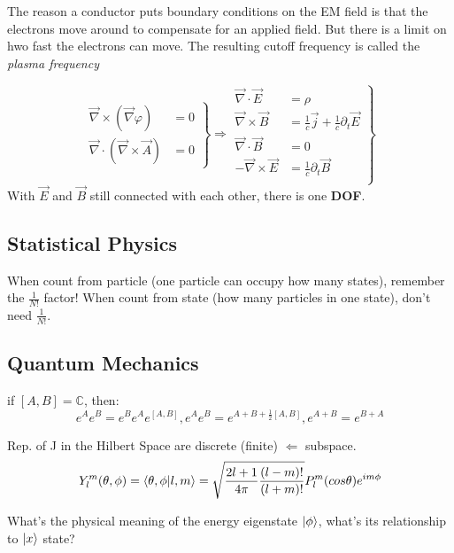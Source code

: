 The reason a conductor puts boundary conditions on the EM field is that the
electrons move around to compensate for an applied field. But there is a
limit on hwo fast the electrons can move. The resulting cutoff frequency is
called the \textit{plasma frequency}
\begin{description}[style=nextline]
    \item [Maxwell Eqn] 
	\begin{equation}
	    \left.
	    \begin{aligned}
		\overrightarrow{\nabla} \times (\overrightarrow{\nabla} \varphi) &= 0 \\
		\overrightarrow{\nabla} \cdot (\overrightarrow{\nabla} \times \overrightarrow{A}) &= 0
	    \end{aligned}
	    \right\} 
	    \Rightarrow 
	    \left.
	    \begin{aligned}
		\overrightarrow{\nabla} \cdot \overrightarrow{E} &= \rho \\
		\overrightarrow{\nabla} \times \overrightarrow{B} &=
		\frac{1}{c} \overrightarrow{j} + \frac{1}{c}\partial_{t}\overrightarrow{E}   \\
		\overrightarrow{\nabla} \cdot \overrightarrow{B} &= 0	\\
		-\overrightarrow{\nabla} \times \overrightarrow{E} &=
		\frac{1}{c} \partial_{t}\overrightarrow{B}   \\
	    \end{aligned}
	    \right\}	
	\end{equation}
	With $\overrightarrow{E}$ and $\overrightarrow{B}$ still connected
	with each other, there is one \textbf{DOF}.
\end{description}
\subsection{Statistical Physics}
\begin{description}[style=nextline]
    \item [Partisian func] When count from particle (one particle can occupy
	how many states), remember the $\frac{1}{N!}$ factor! When count from
	state (how many particles in one state), don't need $\frac{1}{N!}$.
\end{description}

\subsection{Quantum Mechanics}
\begin{description}[style=nextline]
    \item [Baker-Campbell-Hausdorff]	
	if $[A,B] = \mathbb{C}$, then:	\\
	$$e^{A}e^{B} = e^{B}e^{A}e^{[A,B]}, e^{A}e^{B} =
	e^{A+B+\frac{1}{2}[A,B]}, e^{A+B} = e^{B+A}$$
    \item [Angular Momentum] Rep. of J in the Hilbert Space are discrete
	(finite) $\Leftarrow$ subspace.
	$$Y^m_l(\theta,\phi) = \bra{\theta,\phi}\ket{l,m} =
	\sqrt{\frac{2l+1}{4\pi}\frac{(l-m)!}{(l+m)!}}P^m_l(cos\theta)e^{im\phi} $$
    \item [Harmonic Oscillator]	What's the physical meaning of the energy
	eigenstate $\ket{\phi}$, what's its relationship to $\ket{x}$ state?
\end{description}
